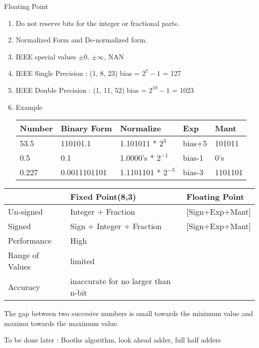 \begin{enumerate}
\begin{minipage}{\linewidth}
    \item Floating Point
    \begin{enumerate}
        \item Do not reserve bits for the integer or fractional parts.
        \item Normalized Form and De-normalized form.
        \item IEEE special values \( \pm 0\), \( \pm \infty \), NAN
        \item IEEE Single Precision : (1, 8, 23) bias = \(2^7 - 1\) = 127
        \item IEEE Double Precision : (1, 11, 52) bias = \(2^{10} - 1\) = 1023
        \item Example \\
        \begin{myTableStyle} \begin{tabular}{ |m{1cm}|m{3cm}|m{3cm}|m{1cm}|l| } \hline
            Number & Binary Form  &  Normalize              &  Exp    & Mant  \\ \hline
            53.5   & 110101.1     &  1.101011 * \(2^5\)     &  bias+5 & 101011  \\ \hline
            0.5    & 0.1          &  1.0000's * \(2^{-1}\)  &  bias-1 & 0's  \\ \hline
            0.227  & 0.0011101101 &  1.1101101 * \(2^{-3}\) &  bias-3 & 1101101 \\ \hline
        \end{tabular} \end{myTableStyle} \vspace{0.08in}
    \end{enumerate}

    \begin{myTableStyle} \begin{tabular}{ |m{2cm}|m{6cm}|m{6cm}| } \hline
                            &   Fixed Point(8,3)            & Floating Point            \\ \hline
        Un-signed           &   Integer + Fraction          & [Sign+Exp+Mant]    \\ \hline
        Signed              &   Sign + Integer + Fraction   & [Sign+Exp+Mant]    \\ \hline
        Performance         &   High                        & \\ \hline
        Range of Values     &   limited                     & \\ \hline
        Accuracy            &   inaccurate for no larger than n-bit  &  \\ \hline
    \end{tabular} \end{myTableStyle} \vspace{0.08in}

    \end{minipage}

    \item The gap between two succesive numbers is small towards the minimum value and maximu towards the maximum value.
    \item To be done later :  Booths algorithm, look ahead adder, full half adders

\end{enumerate}
